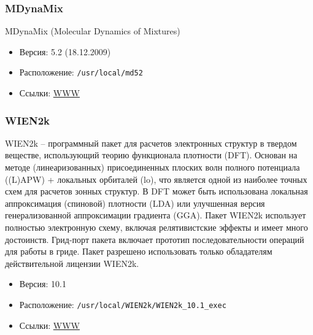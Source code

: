 \documentclass[a4paper,8pt]{extreport}
\newcounter{ex}
\begin{document}
\subsubsection{MDynaMix}
MDynaMix (Molecular Dynamics of Mixtures)
\begin{itemize}
 \item Версия: 5.2 (18.12.2009)
 \item Расположение: \verb|/usr/local/md52|
 \item Ссылки: \href{http://www.fos.su.se/~sasha/mdynamix/}{WWW}
\end{itemize}

\subsubsection{WIEN2k}
WIEN2k – программный пакет для расчетов электронных структур в твердом веществе, использующий теорию
функционала плотности (DFT). Основан на методе (линеаризованных) присоединенных плоских волн полного
потенциала ((L)APW) + локальных орбиталей (lo), что является одной из наиболее точных схем для расчетов
зонных структур. В DFT может быть использована локальная аппроксимация (спиновой) плотности (LDA) или
улучшенная версия генерализованной аппроксимации градиента (GGA). Пакет WIEN2k использует полностью
электронную схему, включая релятивистские эффекты и имеет много достоинств. Грид-порт пакета включает
прототип последовательности операций для работы в гриде. Пакет разрешено использовать только обладателям
действительной лицензии WIEN2k.
\begin{itemize}
 \item Версия: 10.1
 \item Расположение: \verb|/usr/local/WIEN2k/WIEN2k_10.1_exec|
 \item Ссылки: \href{http://www.wien2k.at/}{WWW}
\end{itemize}



\end{document}
